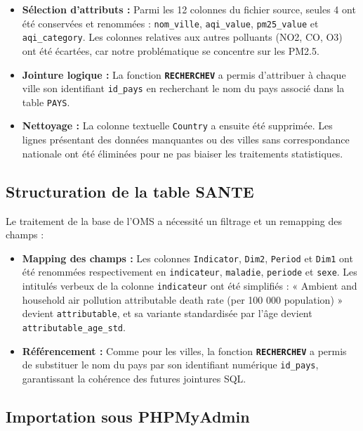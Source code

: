 \documentclass[mstat,12pt]{unswthesis}
\begin{document}
\medskip

\begin{itemize}
  \item \textbf{Sélection d'attributs :} Parmi les 12 colonnes du fichier source, seules 4 ont été conservées et renommées : \texttt{nom\_ville}, \texttt{aqi\_value}, \texttt{pm25\_value} et \texttt{aqi\_category}. Les colonnes relatives aux autres polluants (NO2, CO, O3) ont été écartées, car notre problématique se concentre sur les PM2.5.
  \item \textbf{Jointure logique :} La fonction \textbf{\texttt{RECHERCHEV}} a permis d'attribuer à chaque ville son identifiant \texttt{id\_pays} en recherchant le nom du pays associé dans la table \texttt{PAYS}.
  \item \textbf{Nettoyage :} La colonne textuelle \texttt{Country} a ensuite été supprimée. Les lignes présentant des données manquantes ou des villes sans correspondance nationale ont été éliminées pour ne pas biaiser les traitements statistiques.
\end{itemize}

\subsection{Structuration de la table
SANTE}\label{structuration-de-la-table-sante}

Le traitement de la base de l'OMS a nécessité un filtrage et un
remapping des champs :

\medskip

\begin{itemize}
  \item \textbf{Mapping des champs :} Les colonnes \texttt{Indicator}, \texttt{Dim2}, \texttt{Period} et \texttt{Dim1} ont été renommées respectivement en \texttt{indicateur}, \texttt{maladie}, \texttt{periode} et \texttt{sexe}. Les intitulés verbeux de la colonne \texttt{indicateur} ont été simplifiés : « Ambient and household air pollution attributable death rate (per 100 000 population) » devient \texttt{attributable}, et sa variante standardisée par l'âge devient \texttt{attributable\_age\_std}.
  \item \textbf{Référencement :} Comme pour les villes, la fonction \textbf{\texttt{RECHERCHEV}} a permis de substituer le nom du pays par son identifiant numérique \texttt{id\_pays}, garantissant la cohérence des futures jointures SQL.
\end{itemize}

\subsection{Importation sous
PHPMyAdmin}\label{importation-sous-phpmyadmin}
\end{document}
